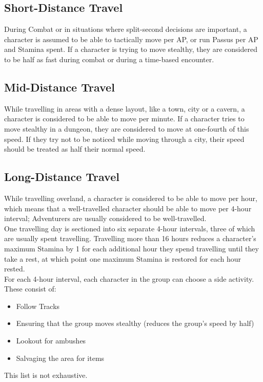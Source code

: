\subsection{Short-Distance Travel}
During Combat or in situations where split-second decisions are important, a character is assumed to be able to tactically move  per AP, or run  Passus per AP and Stamina spent. If a character is trying to move stealthy, they are considered to be half as fast during combat or during a time-based encounter.\\

\subsection{Mid-Distance Travel}
While travelling in areas with a dense layout, like a town, city or a cavern, a character is considered to be able to move  per minute. If a character tries to move stealthy in a dungeon, they are considered to move at one-fourth of this speed. If they try not to be noticed while moving through a city, their speed should be treated as half their normal speed.\\

\subsection{Long-Distance Travel}
While travelling overland, a character is considered to be able to move  per hour, which means that a well-travelled character should be able to move  per 4-hour interval; Adventurers are usually considered to be well-travelled.\\

One travelling day is sectioned into six separate 4-hour intervals, three of which are usually spent travelling. Travelling more than 16 hours reduces a character's maximum Stamina by 1 for each additional hour they spend travelling until they take a rest, at which point one maximum Stamina is restored for each hour rested.\\

For each 4-hour interval, each character in the group can choose a side activity. These consist of:
\begin{itemize}
	\item Follow Tracks
	
	\item Ensuring that the group moves stealthy (reduces the group's speed by half)
	
	\item Lookout for ambushes
	
	\item Salvaging the area for items
	
\end{itemize}
This list is not exhaustive.\\

